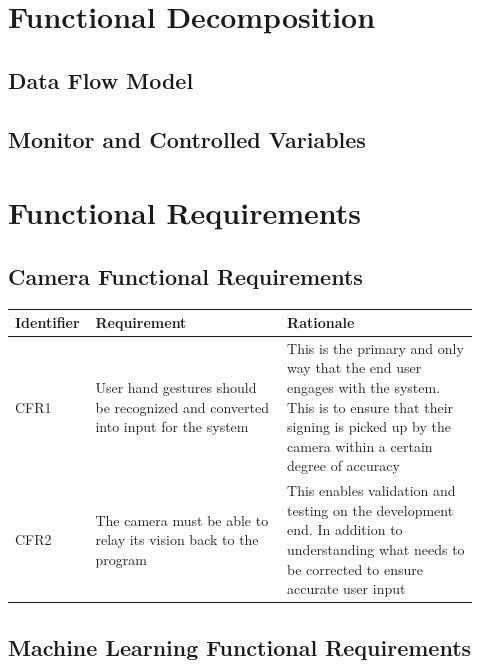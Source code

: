 \documentclass[12pt]{article}
\begin{document}
\section{Functional Decomposition}
\subsection{Data Flow Model}

\subsection{Monitor and Controlled Variables}

\section{Functional Requirements}
\subsection{Camera Functional Requirements}

\renewcommand{\arraystretch}{1.2}
\noindent \begin{tabularx}{\textwidth}{p{0.12\linewidth}|p{0.4\linewidth}|p{0.4\linewidth}}
\toprule
\textbf{Identifier} & \textbf{Requirement} & \textbf{Rationale}\\
\midrule
CFR1 
& User hand gestures should be recognized and converted into input for the system 
& This is the primary and only way that the end user engages with the system. This is to ensure that 
their signing is picked up by the camera within a certain degree of accuracy\\
\hline
CFR2
& The camera must be able to relay its vision back to the program
& This enables validation and testing on the development end. In addition to understanding what needs 
to be corrected to ensure accurate user input\\
\bottomrule
\end{tabularx}

\subsection{Machine Learning Functional Requirements}
\end{document}
